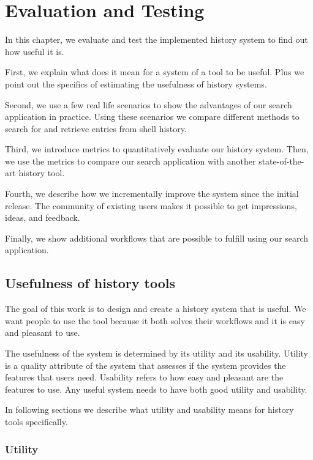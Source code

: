 
\chapter{Evaluation and Testing}

In this chapter, we evaluate and test the implemented history system to find out how useful it is.

First, we explain what does it mean for a system of a tool to be useful. Plus we point out the specifics of estimating the usefulness of history systems.

Second, we use a few real life scenarios to show the advantages of our search application in practice. Using these scenarios we compare different methods to search for and retrieve entries from shell history.

Third, we introduce metrics to quantitatively evaluate our history system. Then, we use the metrics to compare our search application with another state-of-the-art history tool.

Fourth, we describe how we incrementally improve the system since the initial release. The community of existing users makes it possible to get impressions, ideas, and feedback. 

Finally, we show additional workflows that are possible to fulfill using our search application. 

\section{Usefulness of history tools}

The goal of this work is to design and create a history system that is useful. 
We want people to use the tool because it both solves their workflows and it is easy and pleasant to use.

The usefulness of the system is determined by its utility and its usability.\cite{nielsen2012usability} Utility is a quality attribute of the system that assesses if the system provides the features that users need.\cite{nielsen2012usability} Usability refers to how easy and pleasant are the features to use. Any useful system needs to have both good utility and usability.

In following sections we describe what utility and usability means for history tools specifically.

\subsection{Utility}

